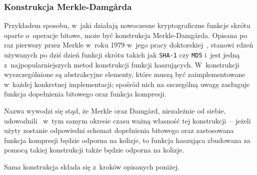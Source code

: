 \subsubsection{Konstrukcja Merkle-Damg\r{a}rda}
Przykładem sposobu, w~jaki działają nowoczesne kryptograficzne funkcje skrótu
oparte o~operacje bitowe, może być konstrukcja Merkle-Damg\r{a}rda. Opisana po
raz pierwszy przez Merkle w~roku 1979 w~jego pracy
doktorskiej~\cite{merkle_damgard_construction}, stanowi rdzeń używanych po dziś
dzień funkcji skrótu takich jak \texttt{SHA-1} czy \texttt{MD5} i~jest jedną
z~najpopularniejszych metod konstrukcji funkcji haszujących. W~konstrukcji
wyszczególnione są abstrakcyjne elementy, które muszą być zaimplementowane
w~każdej konkretnej implementacji; spośród nich na szczególną uwagę zasługuje
funkcja dopełnienia bitowego oraz funkcja kompresji.

Nazwa wywodzi się stąd, że Merkle oraz Damg\r{a}rd, niezależnie od siebie,
udowodnili~\cite{merkle_damgard_security1,merkle_damgard_security2} w~tym samym
okresie czasu ważną własność tej konstrukcji~-- jeżeli użyty zostanie
odpowiedni schemat dopełnienia bitowego oraz zastosowana funkcja kompresji
będzie odporna na kolizje, to funkcja haszująca zbudowana za pomocą takiej
konstrukcji także będzie odporna na kolizje.

Sama konstrukcja składa się z~kroków opisanych poniżej.

